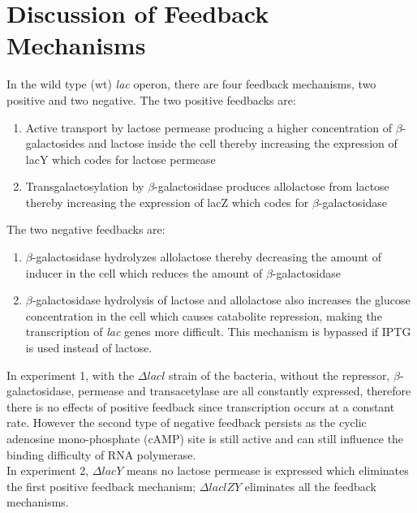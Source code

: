 \documentclass{article}
\begin{document}
\section{Discussion of Feedback Mechanisms}
In the wild type (wt) \textit{lac} operon, there are four feedback mechanisms, two positive and two negative. The two positive feedbacks are:
\begin{enumerate}
  \item Active transport by lactose permease producing a higher concentration of $\beta$-galactosides and lactose inside the cell thereby increasing the expression of lacY which codes for lactose permease
  \item Transgalactosylation by $\beta$-galactosidase produces allolactose from lactose thereby increasing the expression of lacZ which codes for $\beta$-galactosidase
\end{enumerate}
The two negative feedbacks are:
\begin{enumerate}
  \item $\beta$-galactosidase hydrolyzes allolactose thereby decreasing the amount of inducer in the cell which reduces the amount of $\beta$-galactosidase
  \item $\beta$-galactosidase hydrolysis of lactose and allolactose also increases the glucose concentration in the cell which causes catabolite repression, making the transcription of \textit{lac} genes more difficult. This mechanism is bypassed if IPTG is used instead of lactose.
\end{enumerate}
In experiment 1, with the $\Delta lacl$ strain of the bacteria, without the repressor, $\beta$-galactosidase, permease and transacetylase are all constantly expressed, therefore there is no effects of positive feedback since transcription occurs at a constant rate. However the second type of negative feedback persists as the cyclic adenosine mono-phosphate (cAMP) site is still active and can still influence the binding difficulty of RNA polymerase.\\
In experiment 2, $\Delta lacY$ means no lactose permease is expressed which eliminates the first positive feedback mechanism; $\Delta laclZY$ eliminates all the feedback mechanisms.
\end{document}
